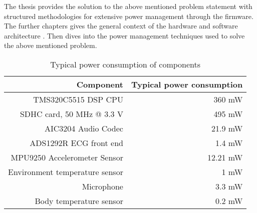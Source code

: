 The thesis provides the solution to the above mentioned problem statement with structured methodologies for extensive power management through the firmware. The further chapters gives the general context of the hardware and software architecture . Then dives into the power management techniques used to solve the above mentioned problem.
\begin{table}
	\centering
	\begin{tabular}{|r|r|}
		\hline
		Component & Typical power consumption\\
		\hline
		TMS320C5515 DSP CPU &  360 mW \\
		SDHC card, 50 MHz @ 3.3 V   &  495 mW \\
		AIC3204 Audio Codec  &  21.9 mW \\	
		ADS1292R ECG front end & 1.4 mW \\
		MPU9250 Accelerometer Sensor &  12.21 mW \\
		Environment temperature sensor  &  1 mW \\
		Microphone  & 3.3 mW \\
		Body temperature sensor  &  0.2 mW \\	
		\hline
	\end{tabular}
	\caption{Typical power consumption of components}
	\label{table:power_rating}
\end{table}

